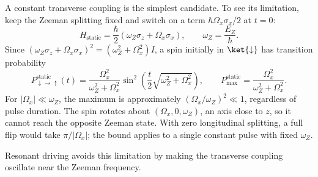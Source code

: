 A constant transverse coupling is the simplest candidate. To see
its limitation, keep the Zeeman splitting fixed and switch on
a term $\hbar\Omega_x\sigma_x/2$ at $t=0$:
\begin{equation}
  H_{\mathrm{static}}=\frac{\hbar}{2}
     (\omega_Z\sigma_z+\Omega_x\sigma_x),\qquad
  \omega_Z=\frac{E_Z}{\hbar}.
  \label{eq:static-transverse-hamiltonian}
\end{equation}
Since $(\omega_Z\sigma_z+\Omega_x\sigma_x)^2
=(\omega_Z^2+\Omega_x^2)I$, a spin initially in $\ket{\downarrow}$
has transition probability
\begin{equation}
  P^{\mathrm{static}}_{\downarrow\to\uparrow}(t)
   =\frac{\Omega_x^2}{\omega_Z^2+\Omega_x^2}
      \sin^2\!\left(\frac{t}{2}\sqrt{\omega_Z^2+\Omega_x^2}\right),
  \qquad
  P_{\max}^{\mathrm{static}}
   =\frac{\Omega_x^2}{\omega_Z^2+\Omega_x^2}.
  \label{eq:static-transverse-probability}
\end{equation}
For $|\Omega_x|\ll\omega_Z$, the maximum is approximately
$(\Omega_x/\omega_Z)^2\ll1$, regardless of pulse duration. The spin rotates about $(\Omega_x,0,\omega_Z)$,
an axis close to $z$, so it cannot reach the opposite Zeeman state.
With zero longitudinal splitting, a full flip would take
$\pi/|\Omega_x|$; the bound applies to a single constant pulse
with fixed $\omega_Z$.

Resonant driving avoids this limitation by making the transverse
coupling oscillate near the Zeeman frequency.

